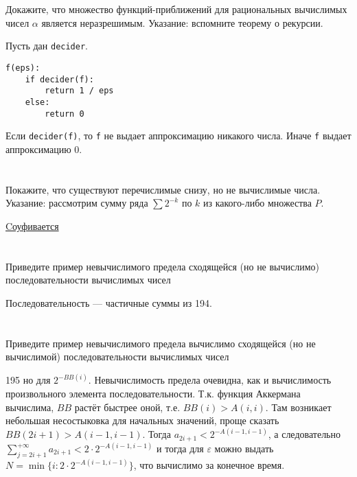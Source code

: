 \section{}
Докажите, что множество функций-приближений для рациональных вычислимых чисел $\alpha$ является неразрешимым. Указание: вспомните теорему о рекурсии.

Пусть дан \texttt{decider}.

\begin{verbatim}
f(eps):
    if decider(f):
        return 1 / eps
    else:
        return 0
\end{verbatim}

Если \texttt{decider(f)}, то \texttt{f} не выдает аппроксимацию никакого числа. Иначе \texttt{f} выдает аппроксимацию 0.

\section{}
Покажите, что существуют перечислимые снизу, но не вычислимые числа. Указание: рассмотрим сумму ряда $\sum 2^{-k}$ по $k$ из какого-либо множества $P$.

\href{https://neerc.ifmo.ru/wiki/index.php?title=%D0%92%D1%8B%D1%87%D0%B8%D1%81%D0%BB%D0%B8%D0%BC%D1%8B%D0%B5_%D1%87%D0%B8%D1%81%D0%BB%D0%B0}{Cоуфивается}

\section{}
Приведите пример невычислимого предела сходящейся (но не вычислимо) последовательности вычислимых чисел

Последовательность --- частичные суммы из 194.

\section{}
Приведите пример невычислимого предела вычислимо сходящейся (но не вычислимой) последовательности вычислимых чисел

195 но для \(2^{ -BB(i)}\). Невычислимость предела очевидна, как и вычислимость произвольного элемента последовательности. Т.к. функция Аккермана вычислима, \(BB\) растёт быстрее оной, т.е. \(BB(i) > A(i, i)\). Там возникает небольшая несостыковка для начальных значений, проще сказать \(BB(2i + 1) > A(i - 1, i - 1)\). Тогда \(a_{2i + 1} < 2^{ -A(i - 1, i - 1)}\), а следовательно \(\sum_{j = 2i + 1}^{+\infty} a_{2i + 1} < 2 \cdot 2^{ -A(i - 1, i - 1)}\) и тогда для \(\varepsilon\) можно выдать \(N = \min \{i : 2 \cdot  2^{ -A(i - 1, i - 1)}\} \), что вычислимо за конечное время.

